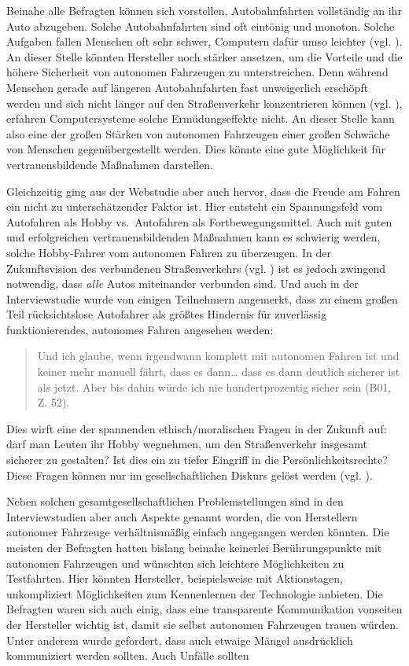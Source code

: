 Beinahe alle Befragten können sich vorstellen, Autobahnfahrten vollständig an ihr Auto abzugeben. Solche Autobahnfahrten sind oft eintönig und monoton. Solche Aufgaben fallen Menschen oft sehr schwer, Computern dafür umso leichter (vgl. \cite[15]{norman2013design}). An dieser Stelle könnten Hersteller noch stärker ansetzen, um die Vorteile und die höhere Sicherheit von autonomen Fahrzeugen zu unterstreichen. Denn während Menschen gerade auf längeren Autobahnfahrten fast unweigerlich erschöpft werden und sich nicht länger auf den Straßenverkehr konzentrieren können (vgl. \cite{ting2008driver}), erfahren Computersysteme solche Ermüdungseffekte nicht. An dieser Stelle kann also eine der großen Stärken von autonomen Fahrzeugen einer großen Schwäche von Menschen gegenübergestellt werden. Dies könnte eine gute Möglichkeit für vertrauensbildende Maßnahmen darstellen.

Gleichzeitig ging aus der Webstudie aber auch hervor, dass die Freude am Fahren ein nicht zu unterschätzender Faktor ist. Hier entsteht ein Spannungsfeld vom Autofahren als Hobby vs.\, Autofahren als Fortbewegungsmittel. Auch mit guten und erfolgreichen vertrauensbildenden Maßnahmen kann es schwierig werden, solche \glq Hobby-Fahrer\grq{} vom autonomen Fahren zu überzeugen. In der Zukunftsvision des verbundenen Straßenverkehrs (vgl. \cite{gerla2014internet}) ist es jedoch zwingend notwendig, dass \emph{alle} Autos miteinander verbunden sind. Und auch in der Interviewstudie wurde von einigen Teilnehmern angemerkt, dass zu einem großen Teil rücksichtslose Autofahrer als größtes Hindernis für zuverlässig funktionierendes, autonomes Fahren angesehen werden:

\begin{quote} 
    Und ich glaube, wenn irgendwann komplett mit autonomen Fahren ist und keiner mehr manuell fährt, dass es dann… dass es dann deutlich sicherer ist als jetzt. Aber bis dahin würde ich nie hundertprozentig sicher sein (B01, Z. 52).
\end{quote}

Dies wirft eine der spannenden ethisch/moralischen Fragen in der Zukunft auf: darf man Leuten ihr Hobby wegnehmen, um den Straßenverkehr insgesamt sicherer zu gestalten? Ist dies ein zu tiefer Eingriff in die Persönlichkeitsrechte? Diese Fragen können nur im gesellschaftlichen Diskurs gelöst werden (vgl. \cite[12]{renn2010risk}).

Neben solchen gesamtgesellschaftlichen Problemstellungen sind in den Interviewstudien aber auch Aspekte genannt worden, die von Herstellern autonomer Fahrzeuge verhältnismäßig einfach angegangen werden könnten. Die meisten der Befragten hatten bislang beinahe keinerlei Berührungspunkte mit autonomen Fahrzeugen und wünschten sich leichtere Möglichkeiten zu Testfahrten. Hier könnten Hersteller, beispielsweise mit Aktionstagen, unkompliziert Möglichkeiten zum Kennenlernen der Technologie anbieten. Die Befragten waren sich auch einig, dass eine transparente Kommunikation vonseiten der Hersteller wichtig ist, damit sie selbst autonomen Fahrzeugen trauen würden. Unter anderem wurde gefordert, dass auch etwaige Mängel ausdrücklich kommuniziert werden sollten. Auch Unfälle sollten 